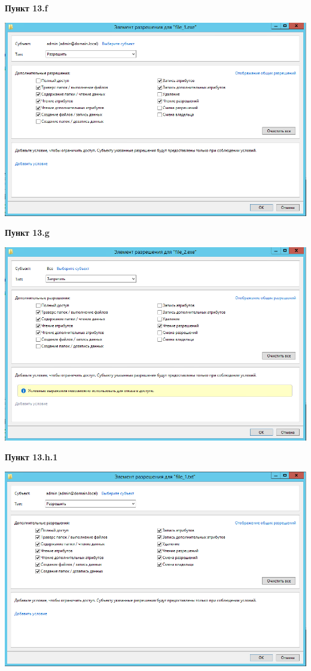 \documentclass[a4paper,14pt]{extarticle}
\begin{document}
    \newpage
    \textbf{Пункт 13.f}
    \begin{center}
        \includegraphics[scale=0.7]{13.f}
    \end{center}
    \textbf{Пункт 13.g}
    \begin{center}
        \includegraphics[scale=0.7]{13.g}
    \end{center}
    \newpage
    \textbf{Пункт 13.h.1}
    \begin{center}
        \includegraphics[scale=0.7]{13.h.1}
    \end{center}
\end{document}
